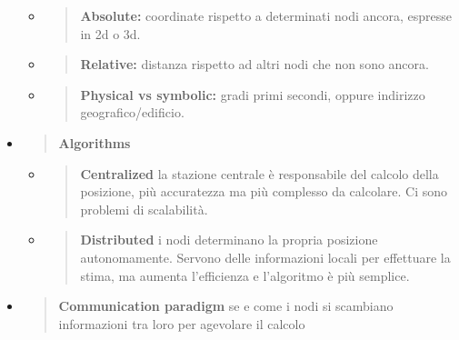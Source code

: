 \begin{itemize}
  \begin{itemize}
  \item
    \begin{quote}
    \textbf{Absolute:} coordinate rispetto a determinati nodi ancora,
    espresse in 2d o 3d.
    \end{quote}
  \item
    \begin{quote}
    \textbf{Relative:} distanza rispetto ad altri nodi che non sono
    ancora.
    \end{quote}
  \item
    \begin{quote}
    \textbf{Physical vs symbolic:} gradi primi secondi, oppure indirizzo
    geografico/edificio.
    \end{quote}
  \end{itemize}
\item
  \begin{quote}
  \textbf{Algorithms}
  \end{quote}

  \begin{itemize}
  \item
    \begin{quote}
    \textbf{Centralized} la stazione centrale è responsabile del calcolo
    della posizione, più accuratezza ma più complesso da calcolare. Ci
    sono problemi di scalabilità.
    \end{quote}
  \item
    \begin{quote}
    \textbf{Distributed} i nodi determinano la propria posizione
    autonomamente. Servono delle informazioni locali per effettuare la
    stima, ma aumenta l'efficienza e l'algoritmo è più semplice.
    \end{quote}
  \end{itemize}
\item
  \begin{quote}
  \textbf{Communication paradigm} se e come i nodi si scambiano
  informazioni tra loro per agevolare il calcolo
  \end{quote}


\end{itemize}
